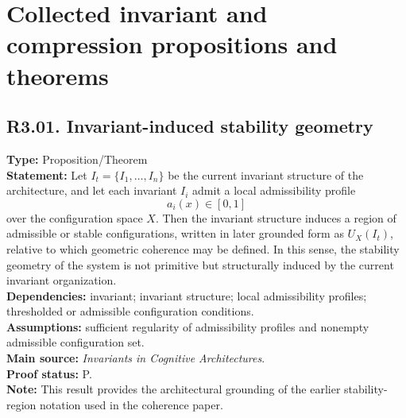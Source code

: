 \documentclass[12pt]{article}
\begin{document}
	\section{Collected invariant and compression propositions and theorems}
	
	\subsection*{R3.01. Invariant-induced stability geometry}
	\textbf{Type:} Proposition/Theorem \\
	\textbf{Statement:} Let $I_t=\{I_1,\dots,I_n\}$ be the current invariant structure of the
	architecture, and let each invariant $I_i$ admit a local admissibility profile
	\[
	a_i(x)\in[0,1]
	\]
	over the configuration space $X$. Then the invariant structure induces a region of admissible
	or stable configurations, written in later grounded form as $U_X(I_t)$, relative to which
	geometric coherence may be defined. In this sense, the stability geometry of the system is not
	primitive but structurally induced by the current invariant organization. \\
	\textbf{Dependencies:} invariant; invariant structure; local admissibility profiles; thresholded
	or admissible configuration conditions. \\
	\textbf{Assumptions:} sufficient regularity of admissibility profiles and nonempty admissible
	configuration set. \\
	\textbf{Main source:} \emph{Invariants in Cognitive Architectures}. \\
	\textbf{Proof status:} P. \\
	\textbf{Note:} This result provides the architectural grounding of the earlier stability-region
	notation used in the coherence paper.
	
\end{document}
